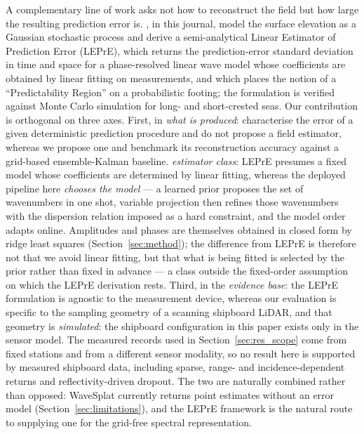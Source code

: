 \documentclass[review]{elsarticle}
\begin{document}
A complementary line of work asks not how to reconstruct the field but how large
the resulting prediction error is.  \citet{fucile2018}, in this journal, model
the surface elevation as a Gaussian stochastic process and derive a
semi-analytical Linear Estimator of Prediction Error (LEPrE), which returns the
prediction-error standard deviation in time and space for a phase-resolved
linear wave model whose coefficients are obtained by linear fitting on
measurements, and which places the notion of a ``Predictability Region'' on a
probabilistic footing; the formulation is verified against Monte Carlo
simulation for long- and short-crested seas.  Our contribution is orthogonal on
three axes.  First, in \emph{what is produced}: \citet{fucile2018} characterise
the error of a given deterministic prediction procedure and do not propose a
field estimator, whereas we propose one and benchmark its reconstruction
accuracy against a grid-based ensemble-Kalman baseline.
\emph{estimator class}: LEPrE presumes a fixed model whose coefficients are
determined by linear fitting, whereas the deployed pipeline here \emph{chooses the
model} --- a learned prior proposes the set of wavenumbers in one shot, variable
projection then refines those wavenumbers with the dispersion relation imposed as a
hard constraint, and the model order adapts online. Amplitudes and phases are
themselves obtained in closed form by ridge least squares
(Section~\ref{sec:method}); the difference from LEPrE is therefore not that we avoid
linear fitting, but that what is being fitted is selected by the prior rather than
fixed in advance --- a class outside the fixed-order assumption on which the LEPrE
derivation rests.
Third, in the \emph{evidence
base}: the LEPrE formulation is agnostic to the measurement device, whereas our
evaluation is specific to the sampling geometry of a scanning shipboard LiDAR,
 and that geometry is \emph{simulated}: the shipboard configuration in this paper
exists only in the sensor model. The measured records used in
Section~\ref{sec:res_scope} come from fixed stations and from a different sensor
modality, so no result here is supported by measured shipboard data,
including sparse, range- and incidence-dependent returns and reflectivity-driven
dropout.  The two are naturally combined rather than opposed: WaveSplat
currently returns point estimates without an error model
(Section~\ref{sec:limitations}), and the LEPrE framework is the natural route to
supplying one for the grid-free spectral representation.
\end{document}
